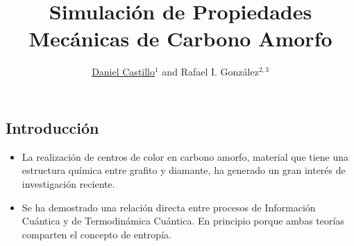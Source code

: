 \documentclass[a0]{sciposter}
\title{Simulación de Propiedades Mecánicas de Carbono Amorfo}
\author{\underline{Daniel Castillo}$^1$ and Rafael I. Gonz\'alez$^{2,3}$}
\institute 
{$^1$Centro de \'Optica e Informaci\'on Cu\'antica, Universidad Mayor, Santiago, Chile.\\$^2$Centro de Nanotecnolog\'ia Aplicada, Universidad Mayor, Santiago, Chile.\\$^2$Centro para el Desarrollo de la Nanociencia y la Nanotecnolog\'ia, CEDENNA, Santiago, Chile.}
\begin{document}
\maketitle
\newcommand{\mycaption}{%
\ifx \@captype \@undefined \@latex@error {\noexpand \caption outside float}\@ehd \expandafter \@gobble \else \refstepcounter \@captype \expandafter \@firstofone \fi {\@dblarg {\@caption \@captype }}
}
\begin{multicols}{2}
\section{Introducción}
\begin{itemize}
\item La realización de centros de color en carbono amorfo, material que tiene una estructura química entre grafito y diamante, ha generado un gran interés de investigación reciente.\\ \item Se ha demostrado una relación directa entre procesos de Información Cuántica y de Termodinámica Cuántica. En principio porque ambas teorías comparten el concepto de entropía.
\end{itemize}

\end{multicols}
\end{document}

